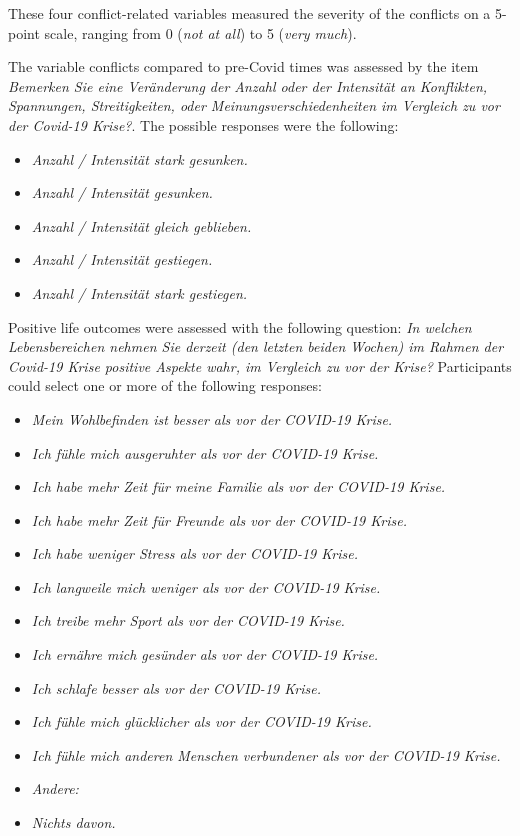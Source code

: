 \documentclass[
  english,
  jou,floatsintext]{apa7}
\begin{document}
These four conflict-related variables measured the severity of the conflicts on a 5-point scale, ranging from 0 (\emph{not at all}) to 5 (\emph{very much}).

The variable conflicts compared to pre-Covid times was assessed by the item \textit{Bemerken Sie eine Veränderung der Anzahl oder der Intensität an Konflikten, Spannungen, Streitigkeiten, oder Meinungsverschiedenheiten im Vergleich zu vor der Covid-19 Krise?}. The possible responses were the following:

\begin{itemize}
    \item \textit{Anzahl / Intensität stark gesunken.}
    \item \textit{Anzahl / Intensität gesunken.}
    \item \textit{Anzahl / Intensität gleich geblieben.}
    \item \textit{Anzahl / Intensität gestiegen.}
    \item \textit{Anzahl / Intensität stark gestiegen.}
\end{itemize}

Positive life outcomes were assessed with the following question: \textit{In welchen Lebensbereichen nehmen Sie derzeit (den letzten beiden Wochen) im Rahmen der Covid-19 Krise positive Aspekte wahr, im Vergleich zu vor der Krise?} Participants could select one or more of the following responses:

\begin{itemize}
    \item \textit{Mein Wohlbefinden ist besser als vor der COVID-19 Krise.}
    \item \textit{Ich fühle mich ausgeruhter als vor der COVID-19 Krise.}
    \item \textit{Ich habe mehr Zeit für meine Familie als vor der COVID-19 Krise.}
    \item \textit{Ich habe mehr Zeit für Freunde als vor der COVID-19 Krise.}
    \item \textit{Ich habe weniger Stress als vor der COVID-19 Krise.}
    \item \textit{Ich langweile mich weniger als vor der COVID-19 Krise.}
    \item \textit{Ich treibe mehr Sport als vor der COVID-19 Krise.}
    \item \textit{Ich ernähre mich gesünder als vor der COVID-19 Krise.}
    \item \textit{Ich schlafe besser als vor der COVID-19 Krise.}
    \item \textit{Ich fühle mich glücklicher als vor der COVID-19 Krise.}
    \item \textit{Ich fühle mich anderen Menschen verbundener als vor der COVID-19 Krise.}
    \item \textit{Andere:}
    \item \textit{Nichts davon.}

\end{itemize}
\end{document}
